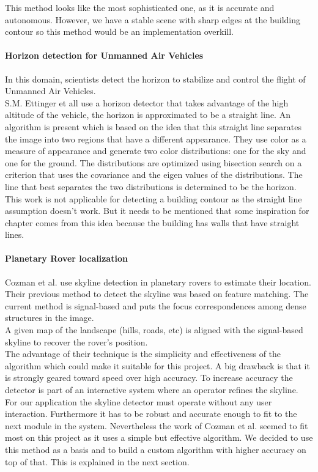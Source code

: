 This method looks like the most sophisticated one, as it is accurate and
autonomous. However, we have a stable scene with sharp edges at the
building contour so this method would be an implementation overkill.  


\paragraph{Horizon detection for Unmanned Air Vehicles}
In this domain, scientists detect the horizon to stabilize and control the
flight of Unmanned Air Vehicles.\\  
S.M. Ettinger et all \cite{Guidedflight} use a horizon detector that takes advantage of the high altitude of the vehicle, the
horizon is approximated to be a straight line.  An algorithm is present which is
based on the idea that this straight line separates the image into two regions
that have a different appearance. They use color as a measure of appearance and
generate two color distributions: one for the sky and one for the ground. The
distributions are optimized using bisection search on a criterion that uses the
covariance and the eigen values of the distributions. The line that best
separates the two distributions is determined to be the horizon.\\

This work is not applicable for detecting a building contour as the
straight line assumption doesn't work. But it needs to be mentioned that some
inspiration for chapter %
comes from this idea because the building has walls that have straight lines.

\paragraph{Planetary Rover localization}
Cozman et al. \cite{Rover} use skyline detection in planetary rovers to estimate their location.  Their
previous method to detect the skyline was based on feature matching. The current
method is signal-based and puts the focus correspondences among dense structures
in the image.\\
A given map of the landscape (hills, roads, etc) is aligned with the
signal-based skyline to recover the rover's position.\\

The advantage of their technique is the simplicity and effectiveness of the
algorithm which could make it suitable for this project.  A big drawback is that
it is strongly geared toward speed over high accuracy. To increase accuracy the
detector is part of an interactive system where an operator refines the skyline.
For our application the skyline detector must operate without any user
interaction. Furthermore it has to be robust and accurate enough to fit to the next module
in the system.  Nevertheless the work of Cozman et al. \cite{Rover} seemed to fit most on
this project as it uses a simple but effective algorithm.  We decided to use
this method as a basis and to build a custom algorithm with higher accuracy on
top of that. This is explained in the next section.


